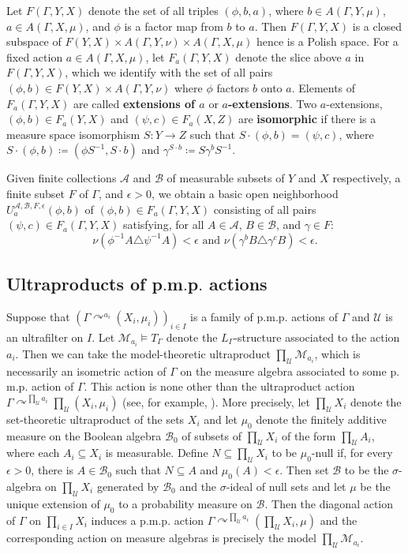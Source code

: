 \documentclass[12pt]{amsart}
\theoremstyle{definition}
\def\cal{\mathcal}
\def\u{\mathsf 1}
\def \u{\mathcal U}
\newcommand{\pmp}{p{$.$}m{$.$}p{$.$}}
\newcommand{\acts}{\curvearrowright}
\begin{document}
Let $F(\Gamma ,Y,X )$ denote the set of all triples $(\phi ,b,a)$, where $b\in A(\Gamma ,Y,\mu)$, $a\in A(\Gamma ,X,\mu)$, and $\phi$ is a factor map from $b$ to $a$. Then $F(\Gamma ,Y,X)$ is a closed subspace of $F(Y,X)\times A(\Gamma ,Y,\nu)\times A(\Gamma ,X,\mu)$ hence is a Polish space. For a fixed action $a\in A(\Gamma ,X,\mu )$, let $F_a(\Gamma ,Y,X)$ denote the slice above $a$ in $F(\Gamma ,Y,X)$, which we identify with the set of all pairs $(\phi , b )\in F(Y,X)\times A(\Gamma,Y,\nu)$ where $\phi$ factors $b$ onto $a$. Elements of $F_a(\Gamma ,Y,X)$ are called {\bf extensions of $a$} or {\bf $a$-extensions}. Two $a$-extensions, $(\phi , b )\in F_a(Y,X)$ and $(\psi ,c )\in F_a(X,Z)$ are {\bf isomorphic} if there is a measure space isomorphism $S:Y\rightarrow Z$ such that $S\cdot (\phi , b) = (\psi , c )$, where $S\cdot (\phi , b ) \coloneqq (\phi S^{-1}, S\cdot b )$ and $\gamma ^{S\cdot b}\coloneqq S\gamma ^{b}S^{-1}$.

Given finite collections $\mathcal{A}$ and $\mathcal{B}$ of measurable subsets of $Y$ and $X$ respectively, a finite subset $F$ of $\Gamma$, and $\epsilon >0$, we obtain a basic open neighborhood $U^{\mathcal{A},\mathcal{B},F,\epsilon}_a(\phi ,b )$ of $(\phi , b )\in F_a(\Gamma,Y,X)$ consisting of all pairs $(\psi , c)\in F_a(\Gamma ,Y,X )$ satisfying, for all $A\in \mathcal{A}$, $B\in \mathcal{B}$, and $\gamma \in F$:
$$
\nu(\phi ^{-1}A\triangle \psi ^{-1}A)<\epsilon \text{ and }
\nu(\gamma ^b B\triangle \gamma ^cB)<\epsilon .
$$

\subsection{Ultraproducts of \texorpdfstring{\pmp}{p.m.p.} actions}\label{ultrasub}

Suppose that $(\Gamma\acts^{a_i}(X_i,\mu_i))_{i\in I}$ is a family of {\pmp} actions of $\Gamma$ and $\u$ is an ultrafilter on $I$.  Let $\cal M_{a_i}\models T_\Gamma$ denote the $L_\Gamma$-structure associated to the action $a_i$.  Then we can take the model-theoretic ultraproduct $\prod_\u \cal M_{a_i}$, which is necessarily an isometric action of $\Gamma$ on the measure algebra associated to some {\pmp} action of $\Gamma$.  This action is none other than the ultraproduct action $\Gamma\acts^{\prod_\u a_i}\prod_\u (X_i,\mu_i)$ (see, for example, \cite{CKT}).  More precisely, let $\prod_\u X_i$ denote the set-theoretic ultraproduct of the sets $X_i$ and let $\mu_0$ denote the finitely additive measure on the Boolean algebra $\cal B_0$ of subsets of $\prod_\u X_i$ of the form $\prod_\u A_i$, where each $A_i\subseteq X_i$ is measurable.  Define $N\subseteq \prod_\u X_i$ to be $\mu_0$-null if, for every $\epsilon>0$, there is $A\in \cal B_0$ such that $N\subseteq A$ and $\mu_0(A)<\epsilon$.  Then set $\cal B$ to be the $\sigma$-algebra on $\prod_\u X_i$ generated by $\cal B_0$ and the $\sigma$-ideal of null sets and let $\mu$ be the unique extension of $\mu_0$ to a probability measure on $\cal B$.  Then the diagonal action of $\Gamma$ on $\prod_{i\in I}X_i$ induces a {\pmp} action $\Gamma\acts^{\prod_\u a_i} (\prod_\u X_i,\mu)$ and the corresponding action on measure algebras is precisely the model $\prod_\u \cal M_{a_i}$.
\end{document}
